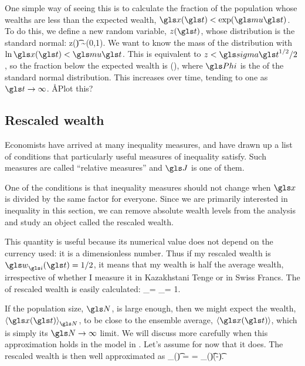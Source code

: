 One simple way of seeing this is to calculate the fraction of the population whose wealths are less than the expected wealth, \ie $\x(\t)<\exp(\gmu \t)$. To do this, we define a new random variable, $z(\t)$, whose distribution is the standard normal:
\be
z(\t) \equiv {} \sim \mathcal{\N}(0,1).
\ee
We want to know the mass of the distribution with $\ln \x(\t)<\gmu \t$. This is equivalent to $z<\gsigma \t^{1/2}/2$, so the fraction below the expected wealth is
\be
\gPhi\left(\right),
\ee
where $\gPhi$ is the \CDF of the standard normal distribution. This increases over time, tending to one as $\t\to\infty$. \AA{Plot this?}


\subsection{Rescaled wealth}
Economists have arrived at many inequality measures, and have drawn up a list of conditions that particularly useful measures of inequality satisfy. Such measures are called ``relative measures'' \cite[Appendix 4]{Sen1997} and $\J$ is one of them.

One of the conditions is that inequality measures should not change when $\x$ is divided by the same factor for everyone. Since we are primarily interested in inequality in this section, we can remove absolute wealth levels from the analysis and study an object called the rescaled wealth.


This quantity is useful because its numerical value does not 
depend on the currency used: it is a dimensionless number. 
Thus if my rescaled wealth is $\gw_\gi(\t) = 1/2$, it means that my wealth is half the 
average wealth, irrespective of whether I measure it in Kazakhstani Tenge 
or in Swiss Francs. The \FEA of rescaled wealth is easily calculated:
\be
\ave{\gw_\gi(\t)}_\N = \ave{\frac{\x(\t)}{\ave{\x(\t)}_\N}}_\N = 1.
\ee

If the population size, $\N$, is large enough, then we might expect the \FEA wealth, $\ave{\x(\t)}_\N$, to be close to the ensemble average, $\ave{\x(\t)}$, which is simply its $\N\to\infty$ limit. We will discuss more carefully when this approximation holds in the \GBM model in . Let's assume for now that it does. The rescaled wealth is then well approximated as
\be
\gw_\gi(\t) = \frac{\x_\gi(\t)}{\ave{\x(\t)}} = \x_\gi(\t)\exp(-\gmu \t).
\ee

